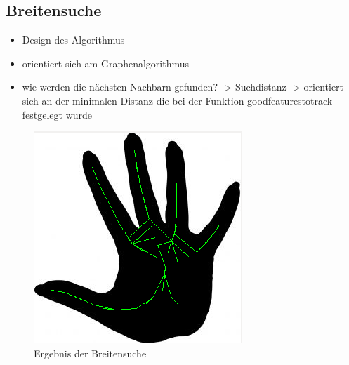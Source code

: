 \subsection{Breitensuche}
\begin{itemize}
\item Design des Algorithmus
\item orientiert sich am Graphenalgorithmus
\item wie werden die nächsten Nachbarn gefunden? -> Suchdistanz -> orientiert sich an der minimalen Distanz die bei der Funktion goodfeaturestotrack festgelegt wurde
\end{itemize}
\label{subsec:breitesuche}
\begin{figure}
\centering
\includegraphics[width=0.4\linewidth]{./fig/hand_BFS}
\caption{Ergebnis der Breitensuche}
\label{fig:hand_BFS}
\end{figure}
